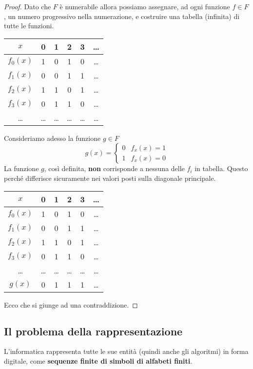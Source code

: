 \begin{theorem}
\begin{proof}
		Dato che $F$ \`e numerabile allora possiamo assegnare, ad ogni funzione $f \in F$, un numero progressivo nella
		numerazione, e costruire una tabella (infinita) di tutte le funzioni.
		\begin{center}
			\begin{tabular}{c | c c c c c}
				$x$      & 0     & 1     & 2     & 3     & \dots \\
				\hline
				$f_0(x)$ & 1     & 0     & 1     & 0     & \dots \\
				$f_1(x)$ & 0     & 0     & 1     & 1     & \dots \\
				$f_2(x)$ & 1     & 1     & 0     & 1     & \dots \\
				$f_3(x)$ & 0     & 1     & 1     & 0     & \dots \\
				\dots    & \dots & \dots & \dots & \dots & \dots
			\end{tabular}
		\end{center}
		Consideriamo adesso la funzione $g \in F$
		\[
			g(x) = \begin{cases}
				0 & f_x (x) = 1 \\
				1 & f_x (x) = 0
			\end{cases}
		\]
		La funzione $g$, cos\`i definita, \textbf{non} corrisponde a nessuna delle $f_i$ in tabella. Questo perch\'e
		differisce sicuramente nei valori posti sulla diagonale principale.
		\begin{center}
			\begin{tabular}{c | c c c c c}
				$x$      & 0     & 1     & 2     & 3     & \dots \\
				\hline
				$f_0(x)$ & 1     & 0     & 1     & 0     & \dots \\
				$f_1(x)$ & 0     & 0     & 1     & 1     & \dots \\
				$f_2(x)$ & 1     & 1     & 0     & 1     & \dots \\
				$f_3(x)$ & 0     & 1     & 1     & 0     & \dots \\
				\dots    & \dots & \dots & \dots & \dots & \dots \\
				\hline
				$g(x)$   & 0     & 1     & 1     & 1     & \dots
			\end{tabular}
		\end{center}
		Ecco che si giunge ad una contraddizione.
	\end{proof}
\end{theorem}

\subsection{Il problema della rappresentazione}
L'informatica rappresenta tutte le sue entit\`a (quindi anche gli algoritmi) in forma digitale, come
\textbf{sequenze finite di simboli di alfabeti finiti}.

